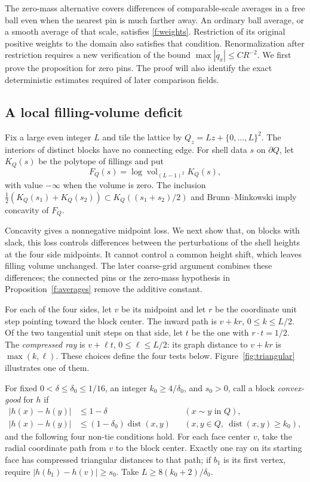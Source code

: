 The zero-mass alternative covers differences of comparable-scale averages
in a free ball even when the nearest pin is much farther away. An ordinary
ball average, or a smooth average of that scale, satisfies
\eqref{f:weights}. Restriction of its original positive weights to the
domain also satisfies that condition. Renormalization after restriction
requires a new verification of the bound $\max|q_x|\le CR^{-2}$.
We first prove the proposition for zero pins. The proof will also identify
the exact deterministic estimates required of later comparison fields.

\subsection{A local filling-volume deficit}
Fix a large even integer $L$ and tile the lattice by
$Q_z=Lz+\{0,\ldots,L\}^2$. The interiors of distinct blocks have no
connecting edge. For shell data $s$ on $\partial Q$, let $K_Q(s)$ be the
polytope of fillings and put
\[
 F_Q(s)=\log\operatorname{vol}_{(L-1)^2}K_Q(s),
\]
with value $-\infty$ when the volume is zero. The inclusion
$\frac12(K_Q(s_1)+K_Q(s_2))\subset K_Q((s_1+s_2)/2)$ and
Brunn--Minkowski imply concavity of $F_Q$.

Concavity gives a nonnegative midpoint loss. We next show that, on blocks
with slack, this loss controls differences between the perturbations of
the shell heights at the four side midpoints. It cannot control a common
height shift, which leaves filling volume unchanged. The later coarse-grid
argument combines these differences; the connected pins or the zero-mass
hypothesis in Proposition~\ref{f:averages} remove the additive constant.

For each of the four sides, let $v$ be its midpoint and let $r$ be
the coordinate unit step pointing toward the block center. The inward
path is $v+kr$, $0\le k\le L/2$. Of the two tangential unit steps
on that side, let $t$ be the one with $r\cdot t=1/2$. The
\emph{compressed ray} is $v+\ell t$, $0\le\ell\le L/2$:
its graph distance to $v+kr$ is $\max(k,\ell)$. These choices define
the four tests below. Figure~\ref{fig:triangular} illustrates one of them.

For fixed $0<\delta\le\delta_0\le1/16$, an integer $k_0\ge4/\delta_0$,
and $s_0>0$, call a block \emph{convex-good} for $h$ if
\begin{align}
 |h(x)-h(y)|&\le1-\delta &&(x\sim y\text{ in }Q),\label{f:near}\\
 |h(x)-h(y)|&\le(1-\delta_0)\operatorname{dist}(x,y)
 &&(x,y\in Q,\ \operatorname{dist}(x,y)\ge k_0),\label{f:far}
\end{align}
and the following four non-tie conditions hold. For each face center $v$,
take the radial coordinate path from $v$ to the block center. Exactly one
ray on its starting face has compressed triangular distances to that path;
if $b_1$ is its first vertex, require $|h(b_1)-h(v)|\ge s_0$.
Take $L\ge8(k_0+2)/\delta_0$.

